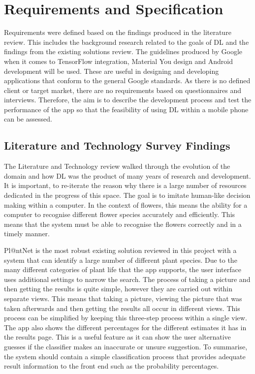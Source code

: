\documentclass[12pt,a4paper]{report}
\begin{document}
\section{Requirements and Specification}

\label{subsec:req}

Requirements were defined based on the findings produced in the literature review. This includes the background research 
related to the goals of DL and the findings from the existing solutions review. The 
guidelines produced by Google when it comes to TensorFlow integration, Material You design and Android development will be used. 
These are useful in designing and developing applications that conform to the general Google standards. As there is
no defined client or target market, there are no requirements based on questionnaires and interviews. 
Therefore, the aim is to describe the development process and test the performance of the app so that the feasibility of 
using DL within a mobile phone can be assessed. 

\subsection{Literature and Technology Survey Findings}

The Literature and Technology review walked through the evolution of the domain and how DL was the product of many years
of research and development. It is important, to re-iterate the reason why there is a large number of resources 
dedicated in the progress of this space. The goal is to imitate human-like decision making within a computer. In the 
context of flowers, this means the ability for a computer to recognise different flower species accurately and 
efficiently. This means that the system must be able to recognise the flowers correctly and in a timely manner.

\par

Pl@ntNet is the most robust existing solution reviewed in this project with a system that can identify a large number of 
different plant species. Due to the many different categories of plant life that the app supports, the user interface 
uses additional settings to narrow the search. The process of taking a picture and then getting the results is quite 
simple, however they are carried out within separate views.  This means that taking a picture, viewing the picture that 
was taken afterwards and then getting the results all occur in different views. This process can be simplified
by keeping this three-step process within a single view. The app also shows the different percentages for the 
different estimates it has in the results page. This is a useful feature as it can show the user alternative 
guesses if the classifier makes an inaccurate or unsure suggestion. To summarise, the system should contain a
simple classification process that provides adequate result information to the front end such as the probability 
percentages. 
\end{document}
